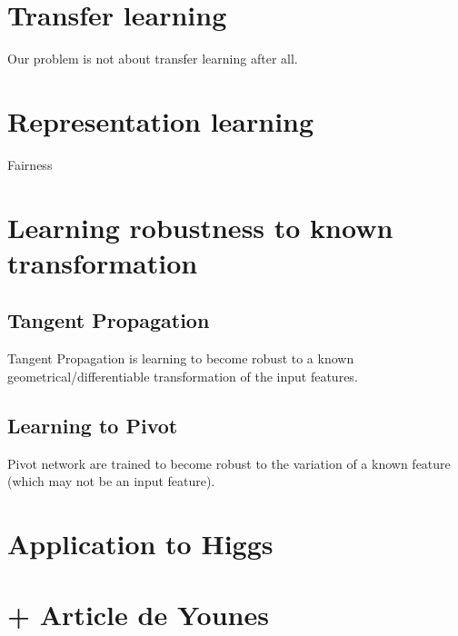 \section{Transfer learning}

Our problem is not about transfer learning after all.

\section{Representation learning}

Fairness

\section{Learning robustness to known transformation}

\subsection{Tangent Propagation}

Tangent Propagation is learning to become robust to a known geometrical/differentiable transformation of the input features.

\subsection{Learning to Pivot}

Pivot network are trained to become robust to the variation of a known feature (which may not be an input feature).


\section{Application to Higgs}




\section{+ Article de Younes}



